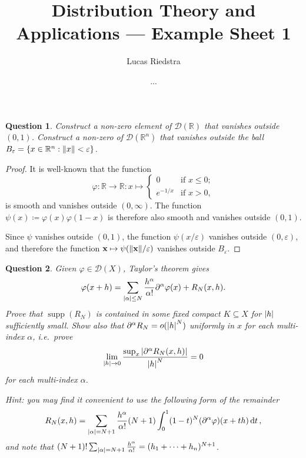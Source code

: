 \documentclass{article}
\title{Distribution Theory and Applications --- Example Sheet 1} %
\author{Lucas Riedstra}
\date{...} %
\theoremstyle{plain}
\newtheorem{question}{Question}
\theoremstyle{remark}
\renewcommand{\vec}{\mathbf}
\renewcommand{\epsilon}{\varepsilon}
\renewcommand{\phi}{\varphi}
\newcommand{\Bb}{\mathbb}
\newcommand{\Cal}{\mathcal}
\newcommand{\RR}{\Bb R}
\newcommand{\DD}{\Cal D}
\newcommand\ceq\coloneqq %
\newcommand\eps\epsilon
\newcommand\pt\partial
\DeclareMathOperator{\supp}{supp}
\begin{document}
\maketitle

\begin{question}
	Construct a non-zero element of $\DD(\RR)$ that vanishes outside $(0, 1)$. Construct a non-zero of $\DD(\RR^n)$ that vanishes outside the ball $B_\eps = \qty{x \in \RR^n : \norm{x} < \eps}$. 
\end{question}

\begin{proof}
	It is well-known that the function 
	\[
	\phi \colon \RR \to \RR \colon x \mapsto \begin{cases}
		0 &\text{if $x \leq 0$}; \\
		e^{-1/x} &\text{if $x > 0$},
	\end{cases}
	\]
	is smooth and vanishes outside $(0, \infty)$. The function $\psi(x) \ceq \phi(x)\phi(1-x)$ is therefore also smooth and vanishes outside $(0, 1)$.  
	
	Since $\psi$ vanishes outside $(0, 1)$, the function $\psi(x/\eps)$ vanishes outside $(0, \eps)$, and therefore the function $\vec x \mapsto \psi(\norm{\vec x}/\eps)$ vanishes outside $B_\eps$. 
\end{proof}

\begin{question}
	Given $\phi \in \DD(X)$, Taylor's theorem gives
	\[
	\phi(x+h) = \sum_{\abs{\alpha} \leq N} \frac{h^\alpha}{\alpha!} \pt^\alpha \phi(x) + R_N(x, h).
	\]
	Prove that $\supp(R_N)$ is contained in some fixed compact $K \subseteq X$ for $\abs{h}$ sufficiently small. Show also that $\pt^\alpha R_N = o(\abs{h}^N)$ uniformly in $x$ for each multi-index $\alpha$, i.e.\ prove 
	\[
	\lim_{\abs{h}\to 0} \frac{\sup_x \abs{\pt^\alpha R_N(x, h)}}{\abs{h}^N} = 0
	\]
	for each multi-index $\alpha$.  
	
	\emph{Hint: you may find it convenient to use the following form of the remainder}
	\[
	R_N(x, h) = \sum_{\abs{\alpha} = N+1} \frac{h^\alpha}{\alpha!}(N+1)\int_0^1 (1-t)^N (\pt^\alpha\phi)(x + th)\dd{t},
	\]
	\emph{and note that} $(N+1)! \sum_{\abs{\alpha} = N+1} \frac{h^\alpha}{\alpha!} = (h_1 + \dotsb + h_n)^{N+1}$. 
\end{question}
\end{document}
